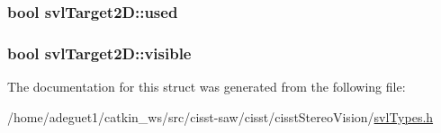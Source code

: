 \hypertarget{structsvl_target2_d_a74896ef54f0cdc80faaee2a7321635bc}{
\subsubsection[{used}]{\setlength{\rightskip}{0pt plus 5cm}bool svl\-Target2\-D\-::used}}\label{structsvl_target2_d_a74896ef54f0cdc80faaee2a7321635bc}
\hypertarget{structsvl_target2_d_a90567161b27a6a1c1a8d1bd15c108d63}{
\subsubsection[{visible}]{\setlength{\rightskip}{0pt plus 5cm}bool svl\-Target2\-D\-::visible}}\label{structsvl_target2_d_a90567161b27a6a1c1a8d1bd15c108d63}


The documentation for this struct was generated from the following file\-:\begin{DoxyCompactItemize}
\item 
/home/adeguet1/catkin\-\_\-ws/src/cisst-\/saw/cisst/cisst\-Stereo\-Vision/\hyperlink{svl_types_8h}{svl\-Types.\-h}\end{DoxyCompactItemize}
